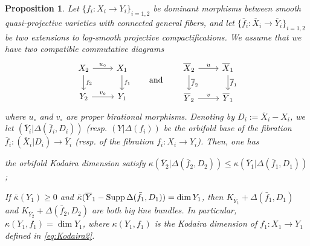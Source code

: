 \documentclass[11pt,english]{smfart}
\theoremstyle{plain}
\newtheorem{proposition}[thm]{Proposition}
\theoremstyle{definition}
\theoremstyle{remark}
\numberwithin{equation}{subsection}
\theoremstyle{plain}
\begin{document}
\begin{proposition}\label{prop:KDF}  Let $\{f_i:X_i\to Y_i\}_{i=1,2}$   be  dominant morphisms between smooth quasi-projective varieties with connected general fibers, and let \(\{\overline{f}_{i}:\overline{X}_{i}\to \overline{Y}_{i}\}_{i=1,2}\) be two extensions to log-smooth projective compactifications. We assume that we have two compatible commutative diagrams
	\begin{equation*}
		\begin{tikzcd}
			X_2 \arrow[r, "u_\circ"]\arrow[d, "f_2"] & X_1\arrow[d, "f_1"] \\
			Y_2 \arrow[r, "v_\circ"] & Y_1 
		\end{tikzcd}
		\hspace*{2em}
		\text{and}
		\hspace*{2em}
		\begin{tikzcd}
			\overline{X}_2 \arrow[r, "u"]\arrow[d, "\overline{f}_2"] & \overline{X}_1\arrow[d, "\overline{f}_1"] \\
			\overline{Y}_2 \arrow[r, "v"] & \overline{Y}_1 
		\end{tikzcd}
	\end{equation*}
	where $u_\circ$ and $v_\circ$ are  proper birational morphisms. Denoting by \(D_{i} := \overline{X}_{i} - X_{i}\), we let \((\overline{Y}_{i}| \Delta(\bar{f}_{i}, D_{i}))\) (resp. \((Y| \Delta(f_{i}))\) be the orbifold base of the fibration \(\overline{f}_{i} : (\overline{X}_{i}| D_{i}) \to \overline{Y}_{i}\) (resp. of the fibration \(f_{i} : X_{i} \to Y_{i}\)). Then, one has
	\begin{thmlist}
	\item the orbifold Kodaira dimension satisfy \(\kappa(\overline{Y}_{2}| \Delta(\bar{f}_{2}, D_{2})) \leq \kappa(\overline{Y}_{1}| \Delta(\bar{f}_{1}, D_{1}))\);  
\item If \(\bar{\kappa}(Y_{1}) \geq 0\) and $\bar{\kappa}(\overline{Y}_1-{\rm Supp}\, \Delta(\bar{f}_1,D_1))=\dim Y_1$, then   
 $K_{\overline{Y}_1}+\Delta(\bar{f}_1,D_1)$ and  $ K_{\overline{Y}_2}+\Delta(\bar{f}_2,D_2)$ are both big line bundles.  
 In particular,  $\kappa(Y_1,f_1)=\dim Y_1$, where $\kappa(Y_1,f_1)$ is the Kodaira dimension of   $f_1:X_1\to Y_1$ defined in  \eqref{eq:Kodaira2}.
	\end{thmlist}
\end{proposition}
\end{document}
